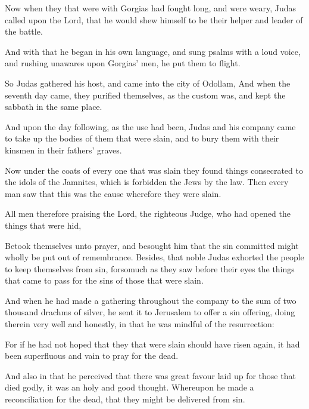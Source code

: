 {\par }{\PP {}Now when they that were with Gorgias had fought long, and were weary, Judas called upon the Lord, that he would shew himself to be their helper and leader of the battle.
\par }{\PP {}And with that he began in his own language, and sung psalms with a loud voice, and rushing unawares upon Gorgias’ men, he put them to flight.
\par }{\PP {}So Judas gathered his host, and came into the city of Odollam, And when the seventh day came, they purified themselves, as the custom was, and kept the sabbath in the same place.
\par }{\PP {}And upon the day following, as the use had been, Judas and his company came to take up the bodies of them that were slain, and to bury them with their kinsmen in their fathers’ graves.
\par }{\PP {}Now under the coats of every one that was slain they found things consecrated to the idols of the Jamnites, which is forbidden the Jews by the law. Then every man saw that this was the cause wherefore they were slain.
\par }{\PP {}All men therefore praising the Lord, the righteous Judge, who had opened the things that were hid,
\par }{\PP {}Betook themselves unto prayer, and besought him that the sin committed might wholly be put out of remembrance. Besides, that noble Judas exhorted the people to keep themselves from sin, forsomuch as they saw before their eyes the things that came to pass for the sins of those that were slain.
\par }{\PP {}And when he had made a gathering throughout the company to the sum of two thousand drachms of silver, he sent it to Jerusalem to offer a sin offering, doing therein very well and honestly, in that he was mindful of the resurrection:
\par }{\PP {}For if he had not hoped that they that were slain should have risen again, it had been superfluous and vain to pray for the dead.
\par }{\PP {}And also in that he perceived that there was great favour laid up for those that died godly, it was an holy and good thought. Whereupon he made a reconciliation for the dead, that they might be delivered from sin.

}
